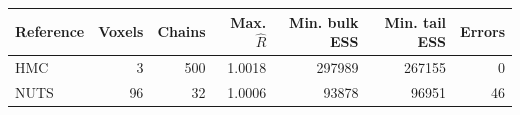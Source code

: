 \begin{tabular}{lrrrrrr}
    \toprule
    Reference & Voxels & Chains & Max. $\hat R$ & Min. bulk ESS & Min. tail ESS & Errors \\
    \midrule
    HMC       & 3      & 500    & 1.0018        & 297989        & 267155        & 0      \\
    NUTS      & 96     & 32     & 1.0006        & 93878         & 96951         & 46     \\
    \bottomrule
\end{tabular}

